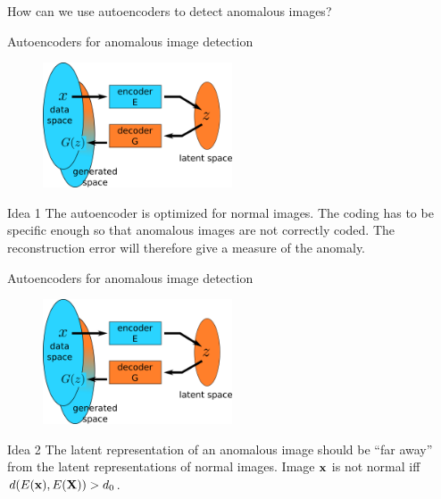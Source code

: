 \documentclass[xcolor=pdftex,dvipsnames,table,mathserif]{beamer}
\begin{document}
\begin{frame}{}

\begin{alertblock}{}
  How can we use autoencoders to detect anomalous images?
\end{alertblock}

\end{frame}


\begin{frame}{Autoencoders for anomalous image detection}

  \begin{figure}[ht]
    \centering
    \includegraphics[width=0.5\textwidth]{ae.png}
  \end{figure}

  \begin{block}{Idea 1}
    The autoencoder is optimized for normal images. The coding has to be specific enough so that anomalous images are not correctly coded. The reconstruction error will therefore give a measure of the anomaly.
  \end{block}

\end{frame}

\begin{frame}{Autoencoders for anomalous image detection}

  \begin{figure}[ht]
    \centering
    \includegraphics[width=0.5\textwidth]{ae.png}
  \end{figure}

  \begin{block}{Idea 2}
    The latent representation of an anomalous image should be ``far away'' from the latent representations of normal images. Image $\mathbf{x}$ is not normal iff $d(E(\mathbf{x}), E(\mathbf{X})) > d_0$.
  \end{block}

\end{frame}
\end{document}
